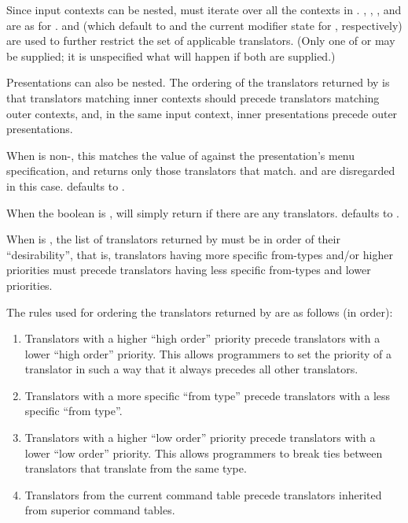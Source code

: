 Since input contexts can be nested,  must
iterate over all the contexts in .  ,
, , and  are as for .
 and  (which default to  and the current
modifier state for , respectively) are used to further restrict the
set of applicable translators.  (Only one of  or 
may be supplied; it is unspecified what will happen if both are supplied.)

Presentations can also be nested.  The ordering of the translators returned by
 is that translators matching inner contexts
should precede translators matching outer contexts, and, in the same input
context, inner presentations precede outer presentations.

When  is non-, this matches the value of 
against the presentation's menu specification, and returns only those
translators that match.   and  are disregarded in
this case.   defaults to .

When the boolean  is , 
will simply return  if there are any translators.  
defaults to .

When  is , the list of translators returned by
 must be in order of their ``desirability'',
that is, translators having more specific from-types and/or higher priorities
must precede translators having less specific from-types and lower priorities.

The rules used for ordering the translators returned by
 are as follows (in order):

\begin{enumerate}
\item Translators with a higher ``high order'' priority precede translators with
a lower ``high order'' priority.  This allows programmers to set the priority of
a translator in such a way that it always precedes all other translators.

\item Translators with a more specific ``from type'' precede translators with a
less specific ``from type''.

\item Translators with a higher ``low order'' priority precede translators with
a lower ``low order'' priority.  This allows programmers to break ties between
translators that translate from the same type.

\item Translators from the current command table precede translators inherited
from superior command tables.
\end{enumerate}

